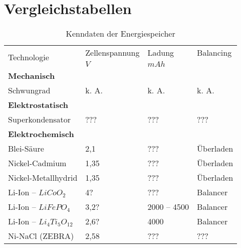 
\section{Vergleichstabellen}
\label{vergleichstabellen_speichertechnologien}
\begin{table}\centering
	\begin{tabularx}{\linewidth}{lXXX}
		\toprule
		\multirow{2}{*}{Technologie} & Zellenspannung           & Ladung       & Balancing \\
		                             & $V$                      & $mAh$        & $ $       \\ \midrule
		\textbf{Mechanisch}          &                          &              &  \\
		Schwungrad                   & k. A.                    & k. A.        & k. A.     \\
		\textbf{Elektrostatisch}     &                          &              &  \\
		Superkondensator             & ???                      & ???          & ???       \\
		\textbf{Elektrochemisch}     &                          &              &  \\
		Blei-Säure                   & 2,1 \cite{Sterner:2014}  & ???          & Überladen \\
		Nickel-Cadmium               & 1,35 \cite{Sterner:2014} & ???          & Überladen \\
		Nickel-Metallhydrid          & 1,35 \cite{Sterner:2014} & ???          & Überladen \\
		Li-Ion -- $LiCoO_2$          & 4? \cite{Sterner:2014}   & ???          & Balancer  \\
		Li-Ion -- $LiFePO_4$         & 3,2? \cite{Sterner:2014} & 2000 -- 4500 & Balancer  \\
		Li-Ion -- $Li_4Ti_5O_{12}$   & 2,6? \cite{Sterner:2014} & 4000         & Balancer  \\
		Ni-NaCl (ZEBRA)              & 2,58 \cite{Sterner:2014} & ???          & ???       \\ \bottomrule
	\end{tabularx}
	\caption{Kenndaten der Energiespeicher}
\end{table}

